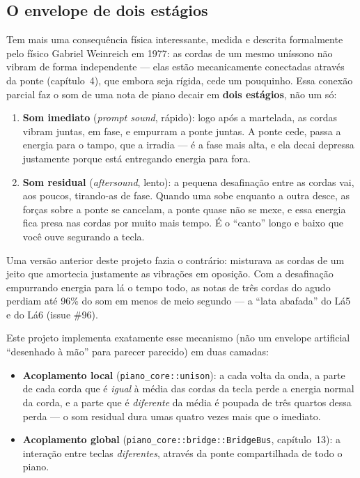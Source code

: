 \documentclass[11pt,oneside]{book}
\begin{document}
\subsection*{O envelope de dois estágios}

Tem mais uma consequência física interessante, medida e descrita
formalmente pelo físico Gabriel Weinreich em 1977: as cordas de um mesmo
uníssono não vibram de forma independente --- elas estão mecanicamente
conectadas através da ponte (capítulo~4), que embora seja rígida, cede um
pouquinho. Essa conexão parcial faz o som de uma nota de piano decair em
\textbf{dois estágios}, não um só:

\begin{enumerate}[leftmargin=1.6em]
\item \textbf{Som imediato} (\emph{prompt sound}, rápido): logo após a
martelada, as cordas vibram juntas, em fase, e empurram a ponte juntas. A
ponte cede, passa a energia para o tampo, que a irradia --- é a fase mais
alta, e ela decai depressa justamente porque está entregando energia para
fora.
\item \textbf{Som residual} (\emph{aftersound}, lento): a pequena
desafinação entre as cordas vai, aos poucos, tirando-as de fase. Quando uma
sobe enquanto a outra desce, as forças sobre a ponte se cancelam, a ponte
quase não se mexe, e essa energia fica presa nas cordas por muito mais
tempo. É o \enquote{canto} longo e baixo que você ouve segurando a tecla.
\end{enumerate}

Uma versão anterior deste projeto fazia o contrário: misturava as cordas de
um jeito que amortecia justamente as vibrações em oposição. Com a
desafinação empurrando energia para lá o tempo todo, as notas de três
cordas do agudo perdiam até 96\% do som em menos de meio segundo --- a
\enquote{lata abafada} do Lá5 e do Lá6 (issue \#96).

Este projeto implementa exatamente esse mecanismo (não um envelope
artificial \enquote{desenhado à mão} para parecer parecido) em duas
camadas:

\begin{itemize}
\item \textbf{Acoplamento local} (\texttt{piano\_core::unison}): a cada
volta da onda, a parte de cada corda que é \emph{igual} à média das cordas
da tecla perde a energia normal da corda, e a parte que é \emph{diferente}
da média é poupada de três quartos dessa perda --- o som residual dura umas
quatro vezes mais que o imediato.
\item \textbf{Acoplamento global} (\texttt{piano\_core::bridge::BridgeBus},
capítulo~13): a interação entre teclas \emph{diferentes}, através da
ponte compartilhada de todo o piano.
\end{itemize}
\end{document}
